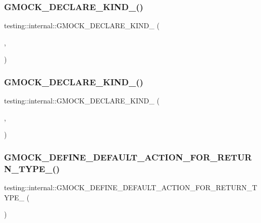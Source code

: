 \subsubsection{\texorpdfstring{GMOCK\_DECLARE\_KIND\_()}{GMOCK\_DECLARE\_KIND\_()}\hspace{0.1cm}{\footnotesize\ttfamily [15/16]}}
{\footnotesize\ttfamily testing\+::internal\+::\+G\+M\+O\+C\+K\+\_\+\+D\+E\+C\+L\+A\+R\+E\+\_\+\+K\+I\+N\+D\+\_\+ (\begin{DoxyParamCaption}\item[{double}]{,  }\item[{\mbox{\hyperlink{namespacetesting_1_1internal_aa8747bda20137c9aa7f846dee830e686acdce59b8c136926ace18aa9c2995878d}{k\+Floating\+Point}}}]{ }\end{DoxyParamCaption})}

\mbox{\label{namespacetesting_1_1internal_af46fdd94d8aea0da729b554de443315f}} 
\subsubsection{\texorpdfstring{GMOCK\_DECLARE\_KIND\_()}{GMOCK\_DECLARE\_KIND\_()}\hspace{0.1cm}{\footnotesize\ttfamily [16/16]}}
{\footnotesize\ttfamily testing\+::internal\+::\+G\+M\+O\+C\+K\+\_\+\+D\+E\+C\+L\+A\+R\+E\+\_\+\+K\+I\+N\+D\+\_\+ (\begin{DoxyParamCaption}\item[{long double}]{,  }\item[{\mbox{\hyperlink{namespacetesting_1_1internal_aa8747bda20137c9aa7f846dee830e686acdce59b8c136926ace18aa9c2995878d}{k\+Floating\+Point}}}]{ }\end{DoxyParamCaption})}

\mbox{\label{namespacetesting_1_1internal_a8fe6f7c11d6d3dd6e42b75c9a5b43861}} 
\subsubsection{\texorpdfstring{GMOCK\_DEFINE\_DEFAULT\_ACTION\_FOR\_RETURN\_TYPE\_()}{GMOCK\_DEFINE\_DEFAULT\_ACTION\_FOR\_RETURN\_TYPE\_()}\hspace{0.1cm}{\footnotesize\ttfamily [1/16]}}
{\footnotesize\ttfamily testing\+::internal\+::\+G\+M\+O\+C\+K\+\_\+\+D\+E\+F\+I\+N\+E\+\_\+\+D\+E\+F\+A\+U\+L\+T\+\_\+\+A\+C\+T\+I\+O\+N\+\_\+\+F\+O\+R\+\_\+\+R\+E\+T\+U\+R\+N\+\_\+\+T\+Y\+P\+E\+\_\+ (\begin{DoxyParamCaption}\item[{void}]{ }\end{DoxyParamCaption})}

